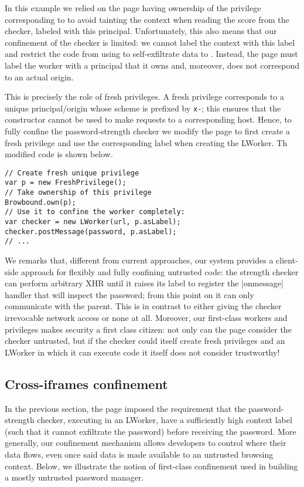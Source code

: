 %
In this example we relied on the page having ownership of the
privilege corresponding to  to avoid tainting the
context when reading the score from the checker, labeled with this
principal.
%
Unfortunately, this also means that our confinement of the checker is
limited: we cannot label the context with this label and restrict the
code from using \xhr{} to self-exfiltrate data to .
%
Instead, the page must label the worker with a principal that it owns
and, moreover, does not correspond to an actual origin.

This is precisely the role of fresh privileges.
%
A fresh privilege corresponds to a unique principal/origin whose
scheme is prefixed by \texttt{x-}; this ensures that the \xhr{}
constructor cannot be used to make requests to a corresponding host.
%
Hence, to fully confine the password-strength checker we modify the
 page to first create a fresh privilege and use the
corresponding label when creating the LWorker.
%
Th modified code is shown below.
\begin{lstlisting}
// Create fresh unique privilege
var p = new FreshPrivilege();
// Take ownership of this privilege
Browbound.own(p);
// Use it to confine the worker completely:
var checker = new LWorker(url, p.asLabel);
checker.postMessage(password, p.asLabel);
// ...
\end{lstlisting}
%

%
We remarks that, different from current approaches, our system
provides a client-side approach for flexibly and fully confining
untrusted code:
%
the strength checker can perform arbitrary XHR until it raises its
label to register the \js|onmessage| handler that will inspect the
password; from this point on it can only communicate with the parent.
%
This is in contrast to either giving the checker irrevocable network
access or none at all.
%
Moreover, our first-class workers and privileges makes security a
first class citizen: not only can the page consider the checker
untrusted, but if the checker could itself create fresh privileges and
an LWorker in which it can execute code it itself does not consider
trustworthy!

\subsection{Cross-iframes confinement}
\label{sec:system:iframe}

In the previous section, the  page imposed the
requirement that the password-strength checker, executing in an
LWorker, have a sufficiently high context label (such that it cannot
exfiltrate the password) before receiving the password.
%
More generally, our confinement mechanism allows developers to control
where their data flows, even once said data is made available to an
untrusted browsing context.
%
Below, we illustrate the notion of first-class confinement used
in building a mostly untrusted password manager.


